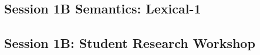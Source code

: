 \subsection{\large Session 1B Semantics: Lexical-1}
\label{parallel-session-1B-trackH}
\TrackHLoc\hfill\sessionchair{}{}
\clearpage
\subsection{\large Session 1B: Student Research Workshop}
\label{parallel-session-1B-trackI}
\TrackILoc\hfill\sessionchair{}{}
\clearpage


